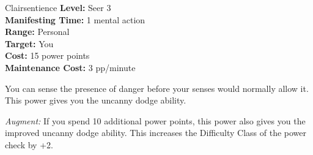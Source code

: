 {Clairsentience}
{
	\textbf{Level:}
	Seer 3\\
	\textbf{Manifesting Time:}
	1 mental action\\
	\textbf{Range:}
	Personal\\
	\textbf{Target:}
	You\\
	\textbf{Cost:}
	15 power points\\
	\textbf{Maintenance Cost:}
	3 pp/minute\\
}
{
	You can sense the presence of danger before your senses would normally allow it. This power gives you the uncanny dodge ability.

	\textit{Augment:} If you spend 10 additional power points, this power also gives you the improved uncanny dodge ability. This increases the Difficulty Class of the power check by +2.
}